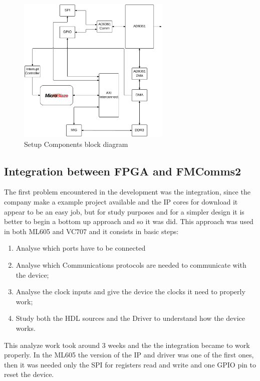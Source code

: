 \begin{figure}[htbp]
    \centering
    \includegraphics[width=0.65\textwidth]{./figures/setup_ipbd}
    \caption{ Setup Components block diagram
    \label{fig:setupip}}
\end{figure}

\subsection{Integration between FPGA and FMComms2}

The first problem encountered in the development was the integration, since the
company make a example project available and the IP cores for download it appear
to be an easy job, but for study purposes and for a simpler design it is better
to begin a bottom up approach and so it was did. This approach was used in both
ML605 and VC707 and it consists in basic steps:

\begin{enumerate}
    \item Analyse which ports have to be connected
    \item Analyse which Communications protocols are needed to communicate with the device;
    \item Analyse the clock inputs and give the device the clocks it need to properly work;
    \item Study both the HDL sources and the Driver to understand how the device works.
\end{enumerate}

This analyze work took around 3 weeks and the the integration became to work
properly. In the ML605 the version of the IP and driver was one of the first
ones, then it was needed only the SPI for registers read and write and one
GPIO pin to reset the device.


